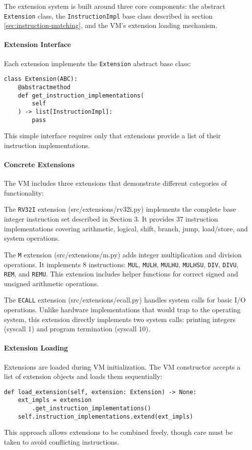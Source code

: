 \documentclass[sigconf]{acmart}
\begin{document}
The extension system is built around three core components: the abstract \texttt{Extension} class, the \texttt{InstructionImpl} base class described in section \ref{sec:instruction-matching}, and the VM's extension loading mechanism.

\paragraph{Extension Interface}
Each extension implements the \texttt{Extension} abstract base class:
\begin{verbatim}
class Extension(ABC):
    @abstractmethod
    def get_instruction_implementations(
        self
    ) -> list[InstructionImpl]:
        pass
\end{verbatim}
This simple interface requires only that extensions provide a list of their instruction implementations.

\paragraph{Concrete Extensions}
The VM includes three extensions that demonstrate different categories of functionality:

The \texttt{RV32I} extension (src/extensions/rv32i.py) implements the complete base integer instruction set described in Section 3. It provides 37 instruction implementations covering arithmetic, logical, shift, branch, jump, load/store, and system operations.

The \texttt{M} extension (src/extensions/m.py) adds integer multiplication and division operations. It implements 8 instructions: \texttt{MUL}, \texttt{MULH}, \texttt{MULHU}, \texttt{MULHSU}, \texttt{DIV}, \texttt{DIVU}, \texttt{REM}, and \texttt{REMU}. This extension includes helper functions for correct signed and unsigned arithmetic operations.

The \texttt{ECALL} extension (src/extensions/ecall.py) handles system calls for basic I/O operations. Unlike hardware implementations that would trap to the operating system, this extension directly implements two system calls: printing integers (syscall 1) and program termination (syscall 10).

\paragraph{Extension Loading}
Extensions are loaded during VM initialization. The VM constructor accepts a list of extension objects and loads them sequentially:
\begin{verbatim}
def load_extension(self, extension: Extension) -> None:
    ext_impls = extension
        .get_instruction_implementations()
    self.instruction_implementations.extend(ext_impls)
\end{verbatim}
This approach allows extensions to be combined freely, though care must be taken to avoid conflicting instructions.
\end{document}
